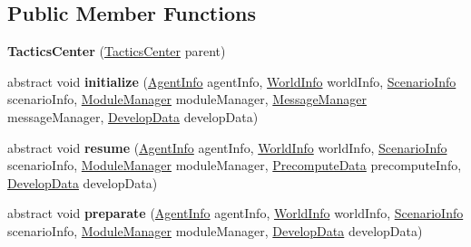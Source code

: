 \subsection*{Public Member Functions}
\begin{DoxyCompactItemize}
\item 
\hypertarget{classadf_1_1component_1_1tactics_1_1center_1_1TacticsCenter_a1d0c7a4a40337bac348ed34245f7cdc8}{}\label{classadf_1_1component_1_1tactics_1_1center_1_1TacticsCenter_a1d0c7a4a40337bac348ed34245f7cdc8} 
{\bfseries Tactics\+Center} (\hyperlink{classadf_1_1component_1_1tactics_1_1center_1_1TacticsCenter}{Tactics\+Center} parent)
\item 
\hypertarget{classadf_1_1component_1_1tactics_1_1center_1_1TacticsCenter_a67fab2cd7720c35a40061fbbf704e05b}{}\label{classadf_1_1component_1_1tactics_1_1center_1_1TacticsCenter_a67fab2cd7720c35a40061fbbf704e05b} 
abstract void {\bfseries initialize} (\hyperlink{classadf_1_1agent_1_1info_1_1AgentInfo}{Agent\+Info} agent\+Info, \hyperlink{classadf_1_1agent_1_1info_1_1WorldInfo}{World\+Info} world\+Info, \hyperlink{classadf_1_1agent_1_1info_1_1ScenarioInfo}{Scenario\+Info} scenario\+Info, \hyperlink{classadf_1_1agent_1_1module_1_1ModuleManager}{Module\+Manager} module\+Manager, \hyperlink{classadf_1_1agent_1_1communication_1_1MessageManager}{Message\+Manager} message\+Manager, \hyperlink{classadf_1_1agent_1_1develop_1_1DevelopData}{Develop\+Data} develop\+Data)
\item 
\hypertarget{classadf_1_1component_1_1tactics_1_1center_1_1TacticsCenter_afd8bf28e492bc0503a62c564ac604716}{}\label{classadf_1_1component_1_1tactics_1_1center_1_1TacticsCenter_afd8bf28e492bc0503a62c564ac604716} 
abstract void {\bfseries resume} (\hyperlink{classadf_1_1agent_1_1info_1_1AgentInfo}{Agent\+Info} agent\+Info, \hyperlink{classadf_1_1agent_1_1info_1_1WorldInfo}{World\+Info} world\+Info, \hyperlink{classadf_1_1agent_1_1info_1_1ScenarioInfo}{Scenario\+Info} scenario\+Info, \hyperlink{classadf_1_1agent_1_1module_1_1ModuleManager}{Module\+Manager} module\+Manager, \hyperlink{classadf_1_1agent_1_1precompute_1_1PrecomputeData}{Precompute\+Data} precompute\+Info, \hyperlink{classadf_1_1agent_1_1develop_1_1DevelopData}{Develop\+Data} develop\+Data)
\item 
\hypertarget{classadf_1_1component_1_1tactics_1_1center_1_1TacticsCenter_aedfb474f3c6487a591672ca08131aa47}{}\label{classadf_1_1component_1_1tactics_1_1center_1_1TacticsCenter_aedfb474f3c6487a591672ca08131aa47} 
abstract void {\bfseries preparate} (\hyperlink{classadf_1_1agent_1_1info_1_1AgentInfo}{Agent\+Info} agent\+Info, \hyperlink{classadf_1_1agent_1_1info_1_1WorldInfo}{World\+Info} world\+Info, \hyperlink{classadf_1_1agent_1_1info_1_1ScenarioInfo}{Scenario\+Info} scenario\+Info, \hyperlink{classadf_1_1agent_1_1module_1_1ModuleManager}{Module\+Manager} module\+Manager, \hyperlink{classadf_1_1agent_1_1develop_1_1DevelopData}{Develop\+Data} develop\+Data)

\end{DoxyCompactItemize}
